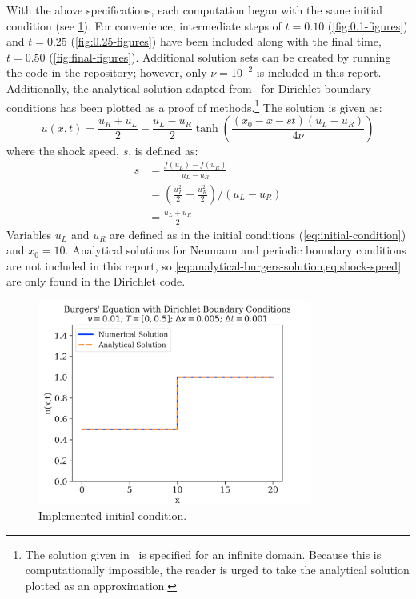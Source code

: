 With the above specifications, each computation began with the same initial condition (see \cref{fig:initial condition}).
For convenience, intermediate steps of $t=0.10$ (\cref{fig:0.1-figures}) and $t=0.25$ (\cref{fig:0.25-figures}) have been included along with the final time, $t=0.50$ (\cref{fig:final-figures}).
Additional solution sets can be created by running the code in the repository; however, only $\nu=10^{-2}$ is included in this report.
Additionally, the analytical solution adapted from~\autocite{cameronNOTESBURGERSEQUATION} for Dirichlet boundary conditions has been plotted as a proof of methods.\footnote{The solution given in~\autocite{cameronNOTESBURGERSEQUATION} is specified for an infinite domain. Because this is computationally impossible, the reader is urged to take the analytical solution plotted as an approximation.}
The solution is given as:
\begin{equation}
	\label{eq:analytical-burgers-solution}
	u(x,t)=\frac{u_R+u_L}{2}-\frac{u_L-u_R}{2}\tanh\left( \frac{\left( x_0-x-st\right)\left( u_L-u_R\right)    }{4\nu} \right)
\end{equation}
where the shock speed, $s$, is defined as:
\begin{equation}
	\label{eq:shock-speed}
	\begin{split}
		s&=\frac{f(u_L)-f(u_R)}{u_L-u_R}\\
		&=\left( \frac{u_L^2}{2}-\frac{u_R^2}{2} \right)/\left( u_L-u_R \right)\\
		&=\frac{u_L+u_R}{2}
	\end{split}
\end{equation}
Variables $u_L$ and $u_R$ are defined as in the initial conditions (\cref{eq:initial-condition}) and $x_0=10$.
Analytical solutions for Neumann and periodic boundary conditions are not included in this report, so \cref{eq:analytical-burgers-solution,eq:shock-speed} are only found in the Dirichlet code.
\begin{figure}
	\centering
	\includegraphics[width=0.8\textwidth]{../dirichlet_BC/images_nu=0.01/0_plot}
	\caption{Implemented initial condition.}
	\label{fig:initial condition}
\end{figure}

